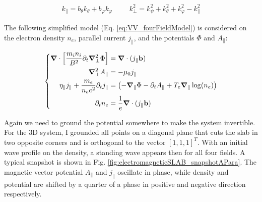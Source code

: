 \begin{align}
	k_\parallel = b_\theta k_\theta + b_\varphi k_\varphi &&& k_\perp^2 = k_\psi^2 + k_\theta^2 + k_\varphi^2 - k_\parallel^2
\end{align}

The following simplified model (Eq. \ref{eq:VV_fourFieldModel}) is considered on the electron density $n_e$, parallel current $j_\parallel$, and the potentials $\Phi$ and $A_\parallel$: \newline

\begin{equation}
	\left\{
	\begin{aligned}
		\grad\cdot\left[\frac{m_i n_i}{ B^2}\partial_t\grad^2_\perp\Phi\right] &= \grad\cdot(j_\parallel\mathbf{b}) \\
		\grad^2_\perp A_\parallel &= -\mu_0j_\parallel \\
		\eta_\parallel j_\parallel + \frac{ m_e}{n_ee^2} \partial_t j_\parallel  &= \left(-\grad_\parallel\Phi - \partial_t A_\parallel + 	T_e\grad_\parallel\log(n_e)\right) \\
		\partial_t n_e &= \frac{1}{e}\grad\cdot (j_\parallel\mathbf{b}) 
	\end{aligned}
	\right.
	\label{eq:VV_fourFieldModel}
\end{equation}

Again we need to ground the potential somewhere to make the system invertible. For the 3D system, I grounded all points on a diagonal plane that cuts the slab in two opposite corners and is orthogonal to the vector $[1,1,1]^T$. With an initial wave profile on the density, a standing wave appears then for all four fields. A typical snapshot is shown in Fig. \ref{fig:electromagneticSLAB_snapshotAPara}. The magnetic vector potential $A_\parallel$ and $j_\parallel$ oscillate in phase, while density and potential are shifted by a quarter of a phase in positive and negative direction respectively.

